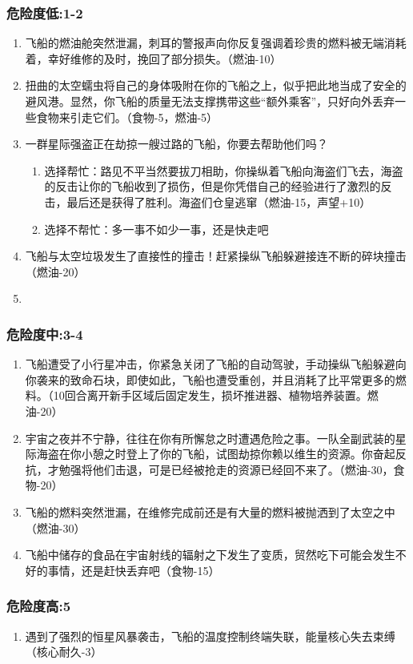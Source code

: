 \documentclass{ctexart}
\begin{document}
			\subsubsection{危险度低:1-2}
			\begin{enumerate}
				\item 飞船的燃油舱突然泄漏，刺耳的警报声向你反复强调着珍贵的燃料被无端消耗着，幸好维修的及时，挽回了部分损失。（燃油-10）
				\item 扭曲的太空蠕虫将自己的身体吸附在你的飞船之上，似乎把此地当成了安全的避风港。显然，你飞船的质量无法支撑携带这些“额外乘客”，只好向外丢弃一些食物来引走它们。（食物-5，燃油-5）
				\item 一群星际强盗正在劫掠一艘过路的飞船，你要去帮助他们吗？
					\begin{enumerate}
					\item 选择帮忙：路见不平当然要拔刀相助，你操纵着飞船向海盗们飞去，海盗的反击让你的飞船收到了损伤，但是你凭借自己的经验进行了激烈的反击，最后还是获得了胜利。海盗们仓皇逃窜（燃油-15，声望+10）
					\item 选择不帮忙：多一事不如少一事，还是快走吧
					\end{enumerate}
				\item 飞船与太空垃圾发生了直接性的撞击！赶紧操纵飞船躲避接连不断的碎块撞击（燃油-20）
				\item 
			\end{enumerate}
			\subsubsection{危险度中:3-4}
			\begin{enumerate}
				\item 飞船遭受了小行星冲击，你紧急关闭了飞船的自动驾驶，手动操纵飞船躲避向你袭来的致命石块，即使如此，飞船也遭受重创，并且消耗了比平常更多的燃料。（10回合离开新手区域后固定发生，损坏推进器、植物培养装置。燃油-20）
				\item 宇宙之夜并不宁静，往往在你有所懈怠之时遭遇危险之事。一队全副武装的星际海盗在你小憩之时登上了你的飞船，试图劫掠你赖以维生的资源。你奋起反抗，才勉强将他们击退，可是已经被抢走的资源已经回不来了。（燃油-30，食物-20）
				\item 飞船的燃料突然泄漏，在维修完成前还是有大量的燃料被抛洒到了太空之中（燃油-30）
				\item 飞船中储存的食品在宇宙射线的辐射之下发生了变质，贸然吃下可能会发生不好的事情，还是赶快丢弃吧（食物-15）
			\end{enumerate}
			\subsubsection{危险度高:5}
			\begin{enumerate}
				\item 遇到了强烈的恒星风暴袭击，飞船的温度控制终端失联，能量核心失去束缚（核心耐久-3）
			\end{enumerate}
\end{document}
